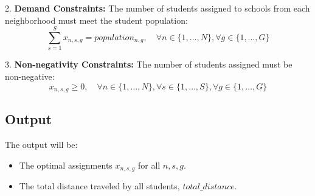 \documentclass{article}
\begin{document}
2. \textbf{Demand Constraints:}
   The number of students assigned to schools from each neighborhood must meet the student population:
   \[
   \sum_{s=1}^{S} x_{n,s,g} = population_{n,g}, \quad \forall n \in \{1, \ldots, N\}, \forall g \in \{1, \ldots, G\}
   \]

3. \textbf{Non-negativity Constraints:}
   The number of students assigned must be non-negative:
   \[
   x_{n,s,g} \geq 0, \quad \forall n \in \{1, \ldots, N\}, \forall s \in \{1, \ldots, S\}, \forall g \in \{1, \ldots, G\}
   \]

\subsection*{Output}
The output will be:
\begin{itemize}
    \item The optimal assignments \( x_{n,s,g} \) for all \( n, s, g \).
    \item The total distance traveled by all students, \( total\_distance \).
\end{itemize}
\end{document}
